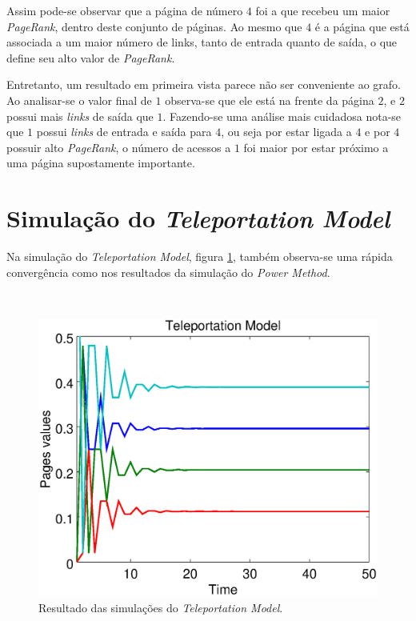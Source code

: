 Assim pode-se observar que a página de número $4$ foi a que recebeu um maior \textit{PageRank}, dentro deste conjunto de páginas. Ao mesmo que $4$ é a página que está associada a um maior número de links, tanto de entrada quanto de saída, o que define seu alto valor de \textit{PageRank}.

Entretanto, um resultado em primeira vista parece não ser conveniente ao grafo. Ao analisar-se o valor final de $1$ observa-se que ele está na frente da página $2$, e $2$ possui mais \textit{links} de saída que $1$. Fazendo-se uma análise mais cuidadosa nota-se que $1$ possui \textit{links} de entrada e saída para $4$, ou seja por estar ligada a $4$ e por $4$ possuir alto \textit{PageRank}, o número de acessos a $1$ foi maior por estar próximo a uma página supostamente importante.     

\section{Simulação do \textit{Teleportation Model}}%

Na simulação do \textit{Teleportation Model}, figura \ref{teleportation}, também observa-se uma rápida convergência como nos resultados da simulação do \textit{Power Method}.

\
\begin{figure}[!htb]
	\centering
	\includegraphics[scale=0.4]{imagens/teleportation}
	\caption{Resultado das simulações do \textit{Teleportation Model}.}
	\label{teleportation}
\end{figure}

